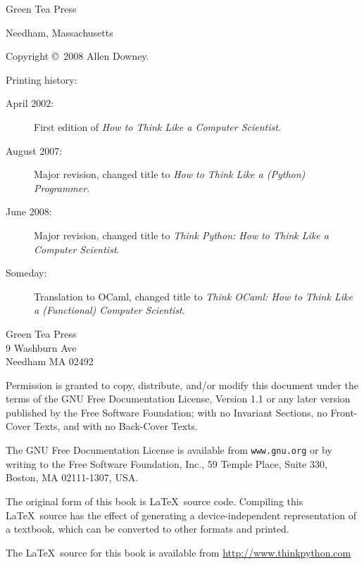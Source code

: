 \documentclass[10pt]{book}
\begin{document}
\begin{latexonly}
\begin{flushright}
\vspace{0.5in}

{\Large Green Tea Press}

{\small Needham, Massachusetts}

\vfill

\end{flushright}


\pagebreak
\thispagestyle{empty}

{\small
Copyright \copyright ~2008 Allen Downey.


Printing history:

\begin{description}

\item[April 2002:] First edition of {\em How to Think Like
a Computer Scientist}.

\item[August 2007:] Major revision, changed title to
{\em How to Think Like a (Python) Programmer}.

\item[June 2008:] Major revision, changed title to
{\em Think Python: How to Think Like
a Computer Scientist}.

\item[Someday:] Translation to OCaml, changed title to
{\em Think OCaml: How to Think Like a (Functional) Computer
Scientist}.

\end{description}

\vspace{0.2in}

\begin{flushleft}
Green Tea Press       \\
9 Washburn Ave \\
Needham MA 02492
\end{flushleft}

Permission is granted to copy, distribute, and/or modify this document
under the terms of the GNU Free Documentation License, Version 1.1 or
any later version published by the Free Software Foundation; with no
Invariant Sections, no Front-Cover Texts, and with no Back-Cover Texts.

The GNU Free Documentation License is available from {\tt www.gnu.org}
or by writing to the Free Software Foundation, Inc., 59 Temple Place,
Suite 330, Boston, MA 02111-1307, USA.

The original form of this book is \LaTeX\ source code.  Compiling this
\LaTeX\ source has the effect of generating a device-independent
representation of a textbook, which can be converted to other formats
and printed.

The \LaTeX\ source for this book is available from
\url{http://www.thinkpython.com}

\vspace{0.2in}

} %

\end{latexonly}
\end{document}
